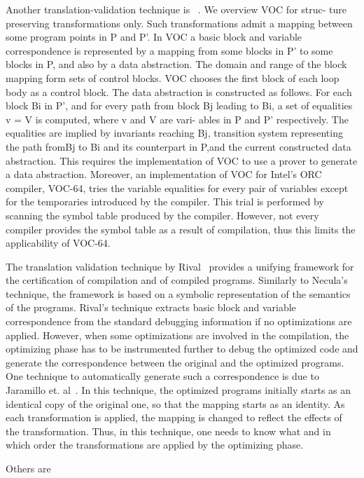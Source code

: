 Another translation-validation technique is ~\cite{VOC2002}. We overview VOC
for struc- ture preserving transformations only. Such transformations admit a
mapping between some program points in P and P'. In VOC a basic block and
variable correspondence is represented by a mapping from some blocks in P' to
some blocks in P, and also by a data abstraction. The domain and range of the
block mapping form sets of control blocks. VOC chooses the first block of each
loop body as a control block. The data abstraction is constructed as follows.
For each block Bi in P', and for every path from block Bj leading to Bi, a set
of equalities v = V is computed, where v and V are vari- ables in P and P'
respectively. The equalities are implied by invariants reaching Bj, transition
system representing the path fromBj to Bi and its counterpart in P,and the
current constructed data abstraction. This requires the implementation of VOC
to use a prover to generate a data abstraction. Moreover, an implementation of
VOC for Intel’s ORC compiler, VOC-64, tries the variable equalities for every
pair of variables except for the temporaries introduced by the compiler. This
trial is performed by scanning the symbol table produced by the compiler.
However, not every compiler provides the symbol table as a result of
compilation, thus this limits the applicability of VOC-64.


The translation validation technique by Rival~\cite{Rival:2004} provides a unifying framework for
the certification of compilation and of compiled programs. Similarly to
Necula’s technique, the framework is based on a symbolic representation of the
semantics of the programs. Rival’s technique extracts basic block and variable
correspondence from the standard debugging information if no optimizations are
applied. However, when some optimizations are involved in the compilation, the
optimizing phase has to be instrumented further to debug the optimized code and
generate the correspondence between the original and the optimized programs.
One technique to automatically generate such a correspondence is due to
Jaramillo et. al~\cite{Jaramillo98}.  In this technique, the optimized programs initially
starts as an identical copy of the original one, so that the mapping starts as
an identity. As each transformation is applied, the mapping is changed to
reflect the effects of the transformation. Thus, in this technique, one needs
to know what and in which order the transformations are applied by the
optimizing phase.  


Others are ~\cite{Bansal17,Churchill2019,Grigory2015}
